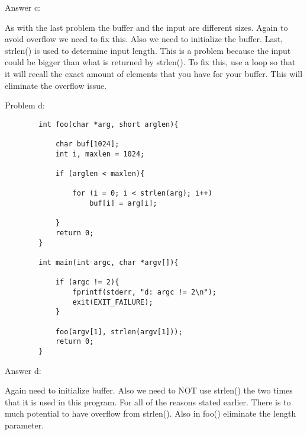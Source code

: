 \documentclass[11pt]{article}
\begin{document}
	\bigskip
	
	Answer c:
	
	\bigskip
	
	As with the last problem the buffer and the input are different sizes. Again to avoid overflow we need to fix this. Also we need to initialize the buffer. Last, strlen() is used to determine input length. This is a problem because the input could be bigger than what is returned by strlen(). To fix this, use a loop so that it will recall the exact amount of elements that you have for your buffer. This will eliminate the overflow issue.
	
	\bigskip
	
	Problem d:
	
	\bigskip
	
	\begin{lstlisting}
		int foo(char *arg, short arglen){

			char buf[1024];
			int i, maxlen = 1024;
		
			if (arglen < maxlen){
		
				for (i = 0; i < strlen(arg); i++)
					buf[i] = arg[i];
		
			}
			return 0;
		}
		
		int main(int argc, char *argv[]){
		
			if (argc != 2){
				fprintf(stderr, "d: argc != 2\n");
				exit(EXIT_FAILURE);
			}
		
			foo(argv[1], strlen(argv[1]));
			return 0;
		}
	\end{lstlisting}
	
	\bigskip
	
	Answer d:
	
	\bigskip
	
	Again need to initialize buffer. Also we need to NOT use strlen() the two times that it is used in this program. For all of the reasons stated earlier. There is to much potential to have overflow from strlen(). Also in foo() eliminate the length parameter.
	
\end{document}
